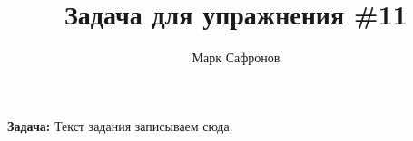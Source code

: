 \documentclass{article}
\title{Задача для упражнения \#11}
\author{Марк Сафронов}
\begin{document}
\maketitle

\textbf{Задача:} Текст задания записываем сюда.
\end{document}
